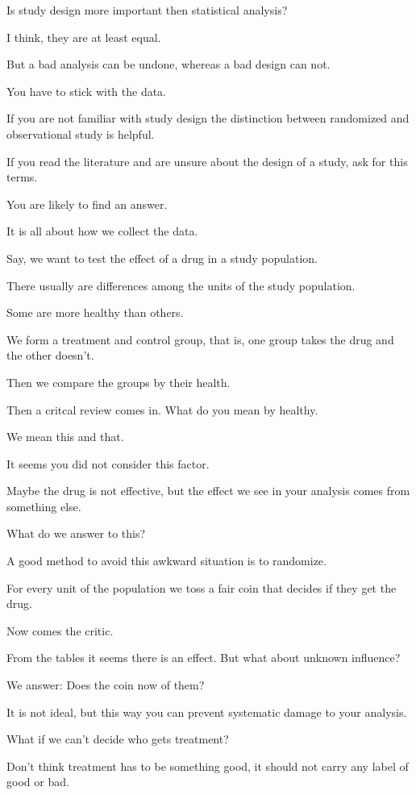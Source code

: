 

Is study design more important then statistical analysis?

I think, they are at least equal. 

But a bad analysis can be undone,
whereas a bad design can not.

You have to stick with the data.

If you are not familiar with study design the distinction between randomized and observational study is helpful.

If you read the literature and are unsure about the design of a study, ask for this terms.

You are likely to find an answer.


It is all about how we collect the data.

Say, we want to test the effect of a drug in a study population.

There usually are differences among the units of the study population.

Some are more healthy than others.

We form a treatment and control group, that is, one group takes the drug and the other doesn't.

Then we compare the groups by their health. 

Then a critcal review comes in. What do you mean by healthy.

We mean this and that.

It seems you did not consider this factor.

Maybe the drug is not effective, but the effect we see in your analysis comes from something else.

What do we answer to this?


A good method to avoid this awkward situation is to randomize.

For every unit of the population we toss a fair coin that decides if they get the drug.

Now comes the critic.

From the tables it seems there is an effect. But what about unknown influence?

We answer: Does the coin now of them?

It is not ideal, but this way you can prevent systematic damage to your analysis.


What if we can't decide who gets treatment?

Don't think treatment has to be something good, it should not carry any label of good or bad.

